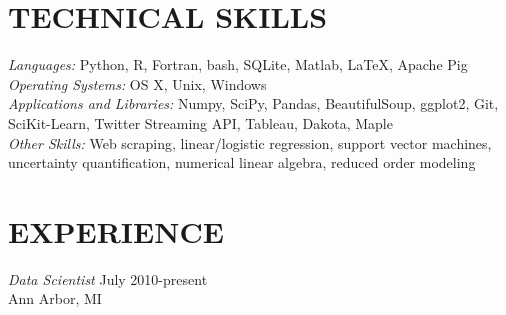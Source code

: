 \documentclass[margin, 10pt]{res} %
\begin{document}
\begin{resume}


\section{TECHNICAL SKILLS} 

{\sl Languages:} Python, R, Fortran, bash, SQLite, Matlab, \LaTeX, Apache Pig \\
{\sl Operating Systems:} OS X, Unix, Windows \\
{\sl Applications and Libraries:} Numpy, SciPy, Pandas, BeautifulSoup, ggplot2, Git, SciKit-Learn, Twitter Streaming API, Tableau, Dakota, Maple  \\
{\sl Other Skills:} Web scraping, linear/logistic regression, support vector machines, uncertainty quantification, numerical linear algebra, reduced order modeling

 
\section{EXPERIENCE}

{\sl Data Scientist} \hfill July 2010-present \\
Ann Arbor, MI


\end{resume}
\end{document}
